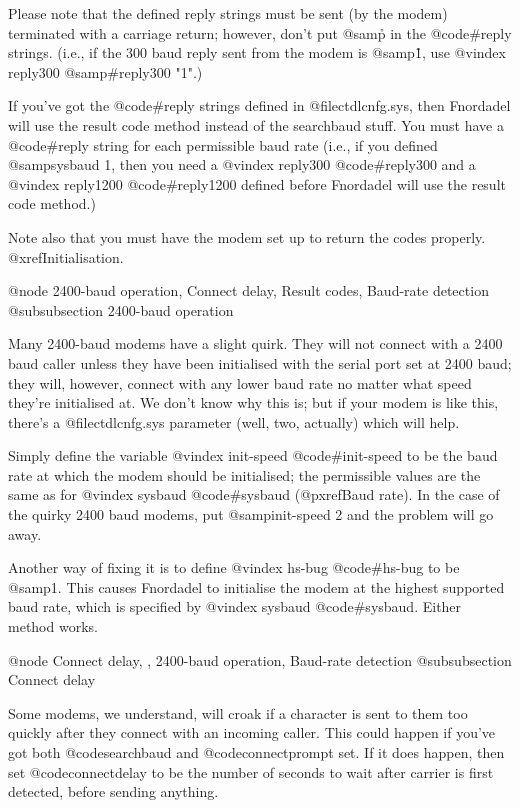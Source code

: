 {{Please note that the defined reply strings
must be sent (by the modem) terminated with a
carriage return; however, don't put @samp{\r} in the
@code{#reply} strings.  (i.e., if the 300 baud reply sent from the modem is
@samp{1\r}, use
@vindex reply300
@samp{#reply300 "1"}.)

If you've got the @code{#reply} strings defined
in @file{ctdlcnfg.sys}, then Fnordadel will use the
result code method instead of the searchbaud
stuff.  You must have a @code{#reply} string for each
permissible baud rate (i.e., if you defined
@samp{sysbaud 1}, then you need a
@vindex reply300
@code{#reply300} and a
@vindex reply1200
@code{#reply1200} defined before Fnordadel will use
the result code method.)

Note also that you must have the modem
set up to return the codes properly.  @xref{Initialisation}.

@node 2400-baud operation, Connect delay, Result codes, Baud-rate detection
@subsubsection 2400-baud operation

Many 2400-baud modems have a slight quirk.
They will not connect with a 2400 baud caller
unless they have been initialised with the serial
port set at 2400 baud; they will, however, connect
with any lower baud rate no matter what speed
they're initialised at.  We don't know why this
is; but if your modem is like this, there's a
@file{ctdlcnfg.sys} parameter (well, two, actually) which
will help.

Simply define the variable
@vindex init-speed
@code{#init-speed} to
be the baud rate at which the modem should be
initialised; the permissible values are the same
as for
@vindex sysbaud
@code{#sysbaud} (@pxref{Baud rate}).  In the case
of the quirky 2400 baud modems, put @samp{init-speed 2}
and the problem will go away.

Another way of fixing it is to define
@vindex hs-bug
@code{#hs-bug} to be @samp{1}.  This causes Fnordadel to initialise
the modem at the highest supported baud rate,
which is specified by
@vindex sysbaud
@code{#sysbaud}.  Either method
works.

@node Connect delay,  , 2400-baud operation, Baud-rate detection
@subsubsection Connect delay

Some modems, we understand, will croak if
a character is sent to them too quickly after they
connect with an incoming caller.  This could
happen if you've got both @code{searchbaud} and
@code{connectprompt} set.  If it does happen, then
set @code{connectdelay} to be the number of seconds
to wait after carrier is first detected, before
sending anything.

}}
